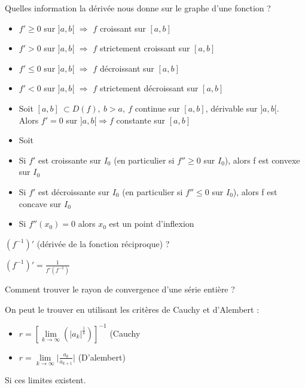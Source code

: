 \documentclass[12pt]{article}
\newcommand*{\xfield}[1]{\begin{mdframed}\centering #1\end{mdframed}\bigskip}
\newenvironment{note}{}{}
\begin{document}
\begin{note}
	\xfield{Quelles information la dérivée nous donne sur le graphe d'une fonction ?}
	\xfield{\begin{itemize}
		\item $f' \ge 0$ sur $]a,b[$ $\Rightarrow$ $f$ croissant sur $[a,b]$
		\item $f' > 0$ sur $]a,b[$ $\Rightarrow$ $f$ strictement croissant sur $[a,b]$
		\item $f' \le 0$ sur $]a,b[$ $\Rightarrow$ $f$ décroissant sur $[a,b]$
		\item $f' < 0$ sur $]a,b[$ $\Rightarrow$ $f$ strictement décroissant sur $[a,b]$
		\item Soit $[a,b]\ \subset D(f),\ b > a,\ f$ continue sur $[a,b]$, dérivable sur $]a,b[$.\\
		Alors $f'=0$ sur $]a,b[ \Rightarrow f$ constante sur $[a,b]$
		\item Soit 
		\item Si $f'$ est croissante sur $I_0$ (en particulier si $f'' \ge 0$ sur $I_0$), alors f est convexe sur $I_0$
		\item Si $f'$ est décroissante sur $I_0$ (en particulier si $f'' \le 0$ sur $I_0$), alors f est concave sur $I_0$ 
		\item Si $f''(x_0) = 0$ alors $x_0$ est un point d'inflexion
	\end{itemize} }
\end{note}

\begin{note}
	\xfield{$(f^{-1})'$ (dérivée de la fonction réciproque) ?}
	\xfield{$(f^{-1})' =  \frac{1}{f'(f^{-1})}$}
\end{note}

\begin{note}
	\xfield{Comment trouver le rayon de convergence d'une série entière ?}
	\xfield{On peut le trouver en utilisant les critères de Cauchy et d'Alembert :\begin{itemize}
	\item $r = \left[ \lim\limits_{k \to \infty} (\vert a_k \vert^{\frac{1}{k}})\right]^{-1}$ (Cauchy
	\item $r=  \lim\limits_{k \to \infty} \big| \frac{a_k}{a_{k+1}}\big|$ (D'alembert)
	\end{itemize}
	 Si ces limites existent.}
\end{note}
\end{document}
